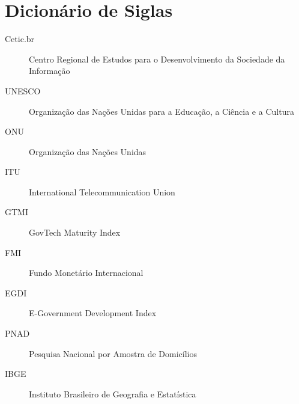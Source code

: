 \section*{Dicionário de Siglas}

\begin{description}
    \item[Cetic.br] Centro Regional de Estudos para o Desenvolvimento da Sociedade da Informação 
    \item[UNESCO] Organização das Nações Unidas para a Educação, a Ciência e a Cultura
    \item[ONU] Organização das Nações Unidas
    \item[ITU] International Telecommunication Union
    \item[GTMI] GovTech Maturity Index
    \item[FMI] Fundo Monetário Internacional
    \item[EGDI] E-Government Development Index
    \item[PNAD] Pesquisa Nacional por Amostra de Domicílios
    \item[IBGE] Instituto Brasileiro de Geografia e Estatística
\end{description}